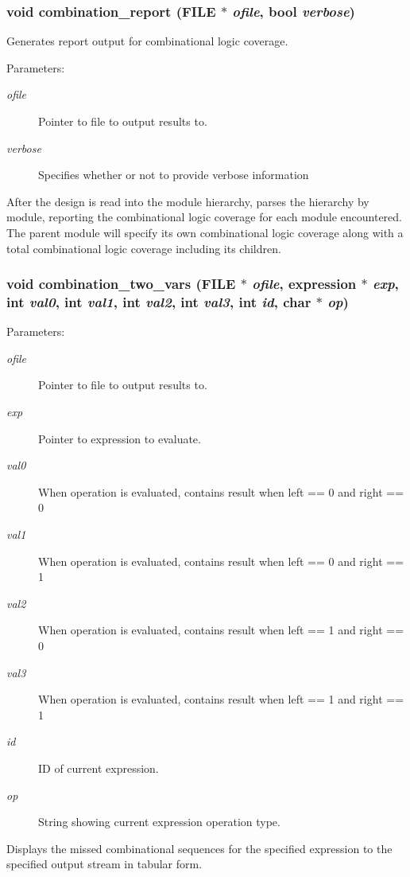 \subsubsection{\setlength{\rightskip}{0pt plus 5cm}void combination\_\-report (FILE $\ast$ {\em ofile}, {\bf bool} {\em verbose})}\label{comb_8c_a20}


Generates report output for combinational logic coverage.

\begin{Desc}
\item[Parameters: ]\par
\begin{description}
\item[{\em 
ofile}]Pointer to file to output results to. \item[{\em 
verbose}]Specifies whether or not to provide verbose information\end{description}
\end{Desc}
After the design is read into the module hierarchy, parses the hierarchy by module, reporting the combinational logic coverage for each module encountered. The parent  module will specify its own combinational logic coverage along with a total combinational logic coverage including its children. 
\subsubsection{\setlength{\rightskip}{0pt plus 5cm}void combination\_\-two\_\-vars (FILE $\ast$ {\em ofile}, {\bf expression} $\ast$ {\em exp}, int {\em val0}, int {\em val1}, int {\em val2}, int {\em val3}, int {\em id}, char $\ast$ {\em op})}\label{comb_8c_a14}


\begin{Desc}
\item[Parameters: ]\par
\begin{description}
\item[{\em 
ofile}]Pointer to file to output results to. \item[{\em 
exp}]Pointer to expression to evaluate. \item[{\em 
val0}]When operation is evaluated, contains result when left == 0 and right == 0 \item[{\em 
val1}]When operation is evaluated, contains result when left == 0 and right == 1 \item[{\em 
val2}]When operation is evaluated, contains result when left == 1 and right == 0 \item[{\em 
val3}]When operation is evaluated, contains result when left == 1 and right == 1 \item[{\em 
id}]ID of current expression. \item[{\em 
op}]String showing current expression operation type.\end{description}
\end{Desc}
Displays the missed combinational sequences for the specified expression to the specified output stream in tabular form. 
